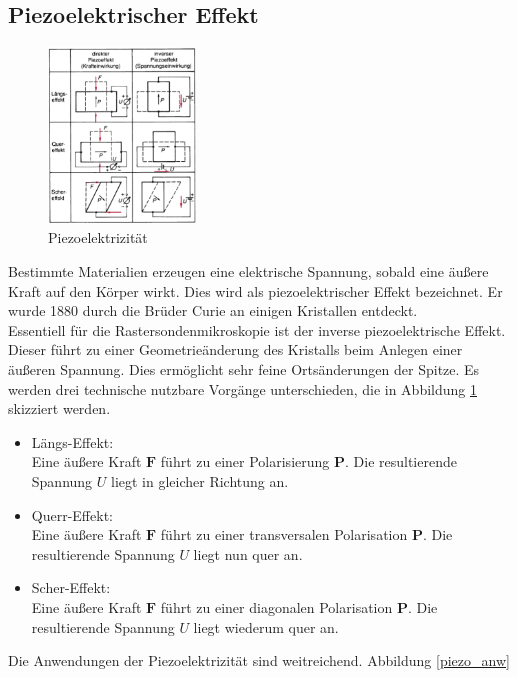     \subsection{Piezoelektrischer Effekt}

\begin{figure}
    \includegraphics[width=0.35\textwidth]{Abb/piezo.png}
    \caption{Piezoelektrizität \cite{phying}}
    \label{piezo}
\end{figure}
Bestimmte Materialien erzeugen eine elektrische Spannung, sobald eine äußere Kraft
auf den Körper wirkt. Dies wird als piezoelektrischer Effekt bezeichnet. Er wurde
1880 durch die Brüder Curie an einigen Kristallen entdeckt.\\
Essentiell für die Rastersondenmikroskopie ist der inverse piezoelektrische Effekt.
Dieser führt zu einer Geometrieänderung des Kristalls beim Anlegen einer äußeren 
Spannung. Dies ermöglicht sehr feine Ortsänderungen der Spitze. Es werden drei 
technische nutzbare Vorgänge unterschieden, die in Abbildung \ref{piezo} skizziert
werden.
\begin{itemize}
    \item Längs-Effekt:\\
          Eine äußere Kraft $\textbf{F}$ führt zu einer Polarisierung $\textbf{P}$.
          Die resultierende Spannung $U$ liegt in gleicher Richtung an.
    \item Querr-Effekt:\\
          Eine äußere Kraft $\textbf{F}$ führt zu einer transversalen Polarisation
          $\textbf{P}$. Die resultierende Spannung $U$ liegt nun quer an.
    \item Scher-Effekt:\\
          Eine äußere Kraft $\textbf{F}$ führt zu einer diagonalen Polarisation
          $\textbf{P}$. Die resultierende Spannung $U$ liegt wiederum quer an.
\end{itemize}
Die Anwendungen der Piezoelektrizität sind weitreichend. Abbildung \ref{piezo_anw} 
